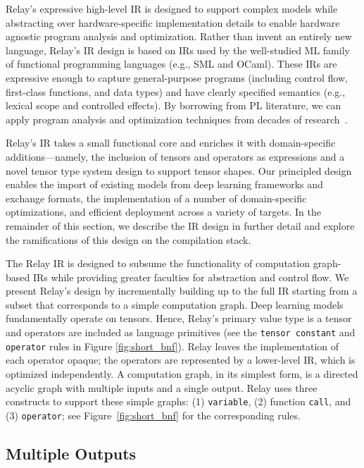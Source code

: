 Relay's expressive high-level IR is designed to support
  complex models while abstracting over hardware-specific
  implementation details to enable hardware agnostic program
  analysis and optimization.
Rather than invent an entirely new language,
  Relay's IR design is based on IRs used by the well-studied ML family of
  functional programming languages (e.g., SML and OCaml).
These IRs are expressive enough to capture general-purpose programs
  (including control flow, first-class functions, and data types)
  and have clearly specified semantics (e.g., lexical scope and controlled effects).
By borrowing from PL literature,
  we can apply program analysis and optimization techniques from decades of research~\citep{haskell_vector}.

Relay's IR takes a small functional core and enriches it with domain-specific additions---namely,
  the inclusion of tensors and operators as expressions
  and a novel tensor type system design to support tensor shapes.
Our principled design
  enables the import of existing models from deep learning frameworks and exchange formats,
  the implementation of a number of domain-specific optimizations,
  and efficient deployment across a variety of targets.
In the remainder of this section,
  we describe the IR design in further detail
  and explore the ramifications of this design on the compilation stack.



The Relay IR is designed
  to subsume the functionality of computation graph-based IRs
  while providing greater faculties for abstraction and control flow.
We present Relay's design by incrementally building up to the full IR
  starting from a subset that corresponds to a simple computation graph.
Deep learning models fundamentally operate on tensors.
Hence, Relay's primary value type is a tensor and operators are included as language primitives
  (see the \verb|tensor constant| and \verb|operator| rules in Figure \ref{fig:short_bnf}).
Relay leaves the implementation of each operator opaque; the operators
  are represented by a lower-level IR, which is optimized independently.
A computation graph, in its simplest form, is a directed acyclic
  graph with multiple inputs and a single output.
Relay uses three constructs to support these simple graphs:
  (1) \verb|variable|, (2) function \verb|call|,
  and (3) \verb|operator|; see Figure~\ref{fig:short_bnf} for the corresponding rules.

\subsection*{Multiple Outputs}

